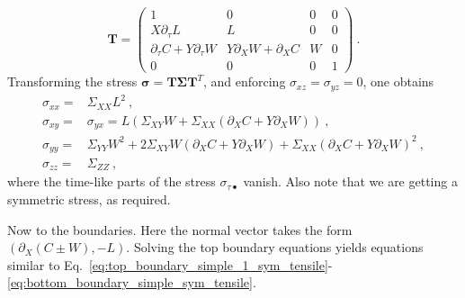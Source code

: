 \documentclass[12pt,a4paper]{article}
\begin{document}
\begin{equation}\label{eq:T_asym_tensile}
  \bm{T} = \left(\begin{array}{cccc}
             1 & 0 & 0 & 0\\
             X \partial_\tau L & L & 0 & 0 \\
             \partial_\tau C + Y \partial_\tau W & Y \partial_X W + \partial_X C & W & 0 \\
             0 & 0 & 0 & 1
           \end{array}\right) \ .
\end{equation}
Transforming the stress $\bm{\sigma} = \bm{T} \bm{\Sigma} \bm{T}^T$, and enforcing $\sigma_{xz}=\sigma_{yz}=0$, one obtains
\begin{equation}\label{eq:stress_transformed_asym_tensile}
  \begin{split}
    \sigma_{xx} =& \Sigma_{XX} L^2 \ , \\
  \sigma_{xy} =& \sigma_{yx} = L\left(\Sigma_{XY} W + \Sigma_{XX}\left(\partial_X C + Y\partial_X W\right)\right) \ , \\
  \sigma_{yy} =& \Sigma_{YY}W^2 + 2\Sigma_{XY}W\left(\partial_X C + Y\partial_X W\right) + \Sigma_{XX}\left(\partial_X C + Y\partial_X W\right)^2 \ , \\
  \sigma_{zz} =& \Sigma_{ZZ} \ ,
  \end{split}
\end{equation}
where the time-like parts of the stress $\sigma_{\tau\bullet}$ vanish. Also note that we are getting a symmetric stress, as required.

Now to the boundaries. Here the normal vector takes the form $\left(\partial_X\left(C\pm W\right), -L\right)$. Solving the top boundary equations yields equations similar to Eq.~\eqref{eq:top_boundary_simple_1_sym_tensile}-\eqref{eq:bottom_boundary_simple_sym_tensile}.
\end{document}
